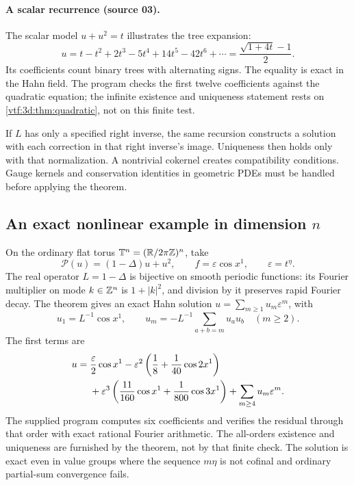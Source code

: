 \documentclass[11pt,letterpaper]{article}
\theoremstyle{definition}
\theoremstyle{remark}
\newcommand{\R}{\mathbb R}\newcommand{\C}{\mathbb C}
\newcommand{\eps}{\varepsilon}
\begin{document}
\paragraph{A scalar recurrence (source 03).} The scalar model $u+u^2=t$
illustrates the tree expansion:
\[
 u=t-t^2+2t^3-5t^4+14t^5-42t^6+\cdots
   =\frac{\sqrt{1+4t}-1}{2}.
\]
Its coefficients count binary trees with alternating signs. The equality is exact in the Hahn field. The program  checks
the first twelve coefficients against the quadratic equation; the infinite existence and uniqueness statement rests on \cref{vtf:3d:thm:quadratic}, not on this finite test.

If $L$ has only a specified right inverse, the same recursion constructs a
solution with each correction in that right inverse's image. Uniqueness then
holds only with that normalization. A nontrivial cokernel creates compatibility
conditions. Gauge kernels and conservation identities in geometric PDEs
must be handled before applying the theorem.

\subsection{An exact nonlinear example in dimension \texorpdfstring{$n$}{n}}

On the ordinary flat torus $\mathbb T^n=(\R/2\pi\Z)^n$, take
\[
 \mathcal P(u)=(1-\Delta)u+u^2,
 \qquad f=\eps\cos x^1,\qquad \eps=t^\eta.
\]
The real operator $L=1-\Delta$ is bijective on smooth periodic functions:
its Fourier multiplier on mode $k\in\mathbb Z^n$ is $1+|k|^2$, and division by
it preserves rapid Fourier decay. The theorem gives an exact Hahn solution
$u=\sum_{m\ge1}u_m\eps^m$, with
\[
 u_1=L^{-1}\cos x^1,\qquad
 u_m=-L^{-1}\sum_{a+b=m}u_au_b\quad(m\ge2).
\]
The first terms are
\begin{align}\label{vtf:eq:examplePDE}
 u={}&\frac{\eps}{2}\cos x^1
 -\eps^2\left(\frac18+\frac1{40}\cos 2x^1\right)\notag\\
 &+\eps^3\left(\frac{11}{160}\cos x^1+
                   \frac1{800}\cos 3x^1\right)
 +\sum_{m\ge4}u_m\eps^m.
\end{align}
The supplied program computes six coefficients and verifies the residual
through that order with exact rational Fourier arithmetic. The all-orders
existence and uniqueness are furnished by the theorem, not by that finite
check. The solution is exact even in value groups where the sequence
$m\eta$ is not cofinal and ordinary partial-sum convergence fails.
\end{document}
